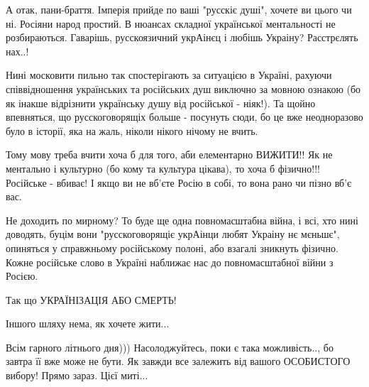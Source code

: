 А отак, пани-браття. Імперія прийде по ваші "русскіє душі", хочете ви цього чи
ні. Росіяни народ простий. В нюансах складної української ментальності не
розбираються. Гаварішь, русскоязичний укрАінєц і любішь Украіну? Расстрєлять
нах..!

Нині московити пильно так спостерігають за ситуацією в Україні, рахуючи
співвідношення українських та російських душ виключно за мовною ознакою (бо як
інакше відрізнити українську душу від російської - ніяк!). Та щойно впевняться,
що русскоговорящіх больше - посунуть сюди, бо це вже неодноразово було в
історії, яка на жаль, ніколи нікого нічому не вчить. 

Тому мову треба вчити хоча б для того, аби елементарно ВИЖИТИ!! Як не ментально
і культурно (бо кому та культура цікава), то хоча б фізично!!! Російське -
вбиває! І якщо ви не вб'єте Росію в собі, то вона рано чи пізно вб'є вас. 

Не доходить по мирному? То буде ще одна повномасштабна війна, і всі, хто нині
доводять, буцім вони "русскоговорящіє укрАінци любят Украіну нє мєньшє",
опиняться у справжньому російському полоні, або взагалі зникнуть фізично. Кожне
російське слово в Україні наближає нас до повномасштабної війни з Росією.

Так що УКРАЇНІЗАЦІЯ АБО СМЕРТЬ!

Іншого шляху нема, як хочете жити...

Всім гарного літнього дня))) Насолоджуйтесь, поки є така можливість.., бо
завтра її вже може не бути. Як завжди все залежить від вашого ОСОБИСТОГО
вибору! Прямо зараз. Цієї миті...

